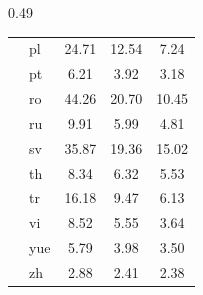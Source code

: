 \begin{table}[ht]
\begin{subtable}[t]{0.49\textwidth}
{\begin{tabular}{@{}clcc|c@{}}
& pl  & 24.71 & 12.54 & 7.24  \\
& pt  & 6.21  & 3.92  & 3.18  \\
& ro  & 44.26 & 20.70 & 10.45 \\
& ru  & 9.91  & 5.99  & 4.81  \\
& sv  & 35.87 & 19.36 & 15.02 \\
& th  & 8.34  & 6.32  & 5.53  \\
& tr  & 16.18 & 9.47  & 6.13  \\
& vi  & 8.52  & 5.55  & 3.64  \\
& yue & 5.79  & 3.98  & 3.50  \\
& zh  & 2.88  & 2.41  & 2.38  \\
\bottomrule
\end{tabular}%
}
\end{subtable}

\end{table}
